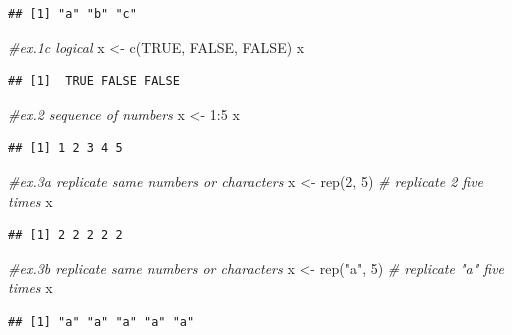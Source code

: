 \documentclass[
]{book}
\newenvironment{Shaded}{\begin{snugshade}}{\end{snugshade}}
\newcommand{\CommentTok}[1]{\textcolor[rgb]{0.56,0.35,0.01}{\textit{#1}}}
\newcommand{\ConstantTok}[1]{\textcolor[rgb]{0.00,0.00,0.00}{#1}}
\newcommand{\DecValTok}[1]{\textcolor[rgb]{0.00,0.00,0.81}{#1}}
\newcommand{\FunctionTok}[1]{\textcolor[rgb]{0.00,0.00,0.00}{#1}}
\newcommand{\NormalTok}[1]{#1}
\newcommand{\OtherTok}[1]{\textcolor[rgb]{0.56,0.35,0.01}{#1}}
\newcommand{\SpecialCharTok}[1]{\textcolor[rgb]{0.00,0.00,0.00}{#1}}
\newcommand{\StringTok}[1]{\textcolor[rgb]{0.31,0.60,0.02}{#1}}
\begin{document}
\begin{verbatim}
## [1] "a" "b" "c"
\end{verbatim}

\begin{Shaded}
\begin{Highlighting}[]
\CommentTok{\#ex.1c logical}
\NormalTok{x }\OtherTok{\textless{}{-}} \FunctionTok{c}\NormalTok{(}\ConstantTok{TRUE}\NormalTok{, }\ConstantTok{FALSE}\NormalTok{, }\ConstantTok{FALSE}\NormalTok{)}
\NormalTok{x}
\end{Highlighting}
\end{Shaded}

\begin{verbatim}
## [1]  TRUE FALSE FALSE
\end{verbatim}

\begin{Shaded}
\begin{Highlighting}[]
\CommentTok{\#ex.2 sequence of numbers}
\NormalTok{x }\OtherTok{\textless{}{-}} \DecValTok{1}\SpecialCharTok{:}\DecValTok{5}
\NormalTok{x}
\end{Highlighting}
\end{Shaded}

\begin{verbatim}
## [1] 1 2 3 4 5
\end{verbatim}

\begin{Shaded}
\begin{Highlighting}[]
\CommentTok{\#ex.3a replicate same numbers or characters}
\NormalTok{x }\OtherTok{\textless{}{-}} \FunctionTok{rep}\NormalTok{(}\DecValTok{2}\NormalTok{, }\DecValTok{5}\NormalTok{) }\CommentTok{\# replicate 2 five times}
\NormalTok{x}
\end{Highlighting}
\end{Shaded}

\begin{verbatim}
## [1] 2 2 2 2 2
\end{verbatim}

\begin{Shaded}
\begin{Highlighting}[]
\CommentTok{\#ex.3b replicate same numbers or characters}
\NormalTok{x }\OtherTok{\textless{}{-}} \FunctionTok{rep}\NormalTok{(}\StringTok{"a"}\NormalTok{, }\DecValTok{5}\NormalTok{) }\CommentTok{\# replicate "a" five times}
\NormalTok{x}
\end{Highlighting}
\end{Shaded}

\begin{verbatim}
## [1] "a" "a" "a" "a" "a"
\end{verbatim}
\end{document}
